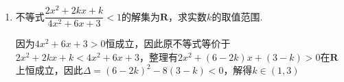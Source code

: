 \begin{enumerate}
\begin{jieda}
\begin{enumerate}
        \end{enumerate}
        求解分式不等式：
        \begin{enumerate}
            \item $\dfrac{3a - 5}{9-a} < 0 \Longrightarrow (3a-5)(9-a) < 0 \Longrightarrow a \in \left(-\infty, \dfrac{5}{3}\right) \cup (9, +\infty)$
            \item $\dfrac{5a - 5}{25-a} \geq 0 \Longrightarrow (5a-5)(25-a) \geq 0, a \neq 25 \Longrightarrow a \in [1, 25)$
        \end{enumerate}
    \end{jieda}
    \item 不等式$\dfrac{2x^2+2kx+k}{4x^2+6x+3} < 1$的解集为$\mathbf{R}$，求实数$k$的取值范围.
    \begin{jieda}
        因为$4x^2+6x+3 > 0$恒成立，因此原不等式等价于$2x^2+2kx+k < 4x^2+6x+3$，整理有$2x^2+(6-2k)x+(3-k) > 0$在$\mathbf{R}$上恒成立，因此$\Delta = (6-2k)^2 - 8(3-k) < 0$，解得$k \in (1, 3)$
    \end{jieda}
\end{enumerate}
